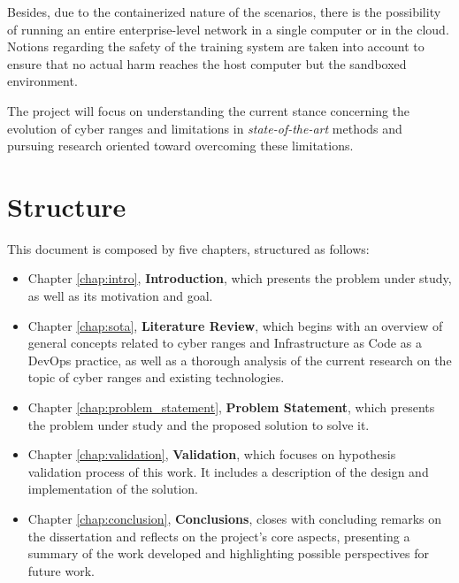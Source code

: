 Besides, due to the containerized nature of the scenarios, there is the possibility of running an entire enterprise-level network in a single computer or in the cloud. Notions regarding the safety of the training system are taken into account to ensure that no actual harm reaches the host computer but the sandboxed environment. 

The project will focus on understanding the current stance concerning the evolution of cyber ranges and limitations in \textit{state-of-the-art} methods and pursuing research oriented toward overcoming these limitations.

\section{Structure} \label{sec:structure}

This document is composed by five chapters, structured as follows:

\begin{itemize}
    \item Chapter \ref{chap:intro}, \textbf{Introduction}, which presents the problem under study, as well as its motivation
and goal.
    \item Chapter \ref{chap:sota}, \textbf{Literature Review}, which begins with an overview of general concepts related to cyber ranges and Infrastructure as Code as a DevOps practice, as well as a thorough analysis of the current research on the topic of cyber ranges and existing technologies.
    \item Chapter \ref{chap:problem_statement}, \textbf{Problem Statement}, which presents the problem under study and the proposed solution to solve it.
    \item Chapter \ref{chap:validation}, \textbf{Validation}, which focuses on hypothesis validation process of this work. It includes a description of the design and implementation of the solution.
    \item Chapter \ref{chap:conclusion}, \textbf{Conclusions}, closes with concluding remarks on the dissertation and reflects on the project's core aspects, presenting a summary of the work developed and highlighting possible perspectives for future work.
\end{itemize}